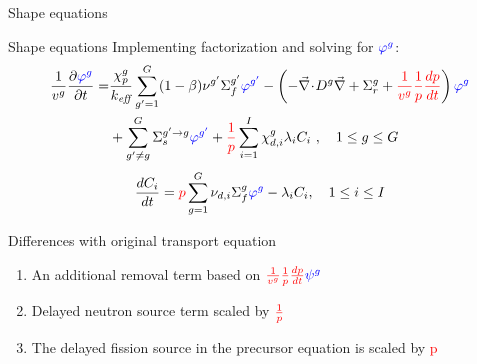 \documentclass[8pt]{beamer}
\renewcommand{\div}{\vec{\nabla}\! \cdot \!}
\newcommand{\grad}{\vec{\nabla}}
\newcommand{\be}{\begin{equation*}}
\newcommand{\ee}{\end{equation*}}
\newcommand{\ben}{\begin{enumerate}}
\newcommand{\een}{\end{enumerate}}
\newcommand{\keff}{\ensuremath{k_{\textit{eff}}}}
\newcommand{\tcr}[1]{\textcolor{red}{#1}}
\newcommand{\tcb}[1]{\textcolor{blue}{#1}}
\begin{document}
\begin{frame}{Shape equations}

\begin{block}{Shape equations}
Implementing factorization and solving for $\tcb{\varphi^g}$:
\begin{align*}
\frac{1}{v^g} \frac{\partial \tcb{\varphi^g} }{\partial t} =& \frac{\chi_p^g}{\keff} \sum_{g'=1}^G (1-\beta) \nu^{g'} \Sigma_f^{g'} \tcb{\varphi^{g'}} -  \left( -\div D^g \grad  + \Sigma_r^g + \tcr{\frac{1}{v^g}}\tcr{\frac{1}{p}}\tcr{\frac{dp}{dt}}\right) \tcb{\varphi^g}  \nonumber \\
&  + \sum_{g'\neq g}^G\Sigma_s^{g'\to g} \tcb{\varphi^{g'}}  + \tcr{\frac{1}{p}}\sum_{i=1}^I\chi_{d,i}^g\lambda_i C_i \ , \quad 1 \le g \le G 
\end{align*}
\begin{equation*}
\frac{dC_i}{dt} = \tcr{p}\sum_{g=1}^G \nu_{d,i} \Sigma_f^g \tcb{\varphi^{g}} - \lambda_iC_i , \quad 1 \le i \le I
\end{equation*}
\end{block}

\begin{block}{Differences with original transport equation}
\ben
\item An additional removal term based on $\tcr{\frac{1}{v^g}\frac{1}{p}\frac{dp}{dt}} \tcb{\psi^g}$
\item Delayed neutron source term scaled by $\tcr{\frac{1}{p}}$
\item The delayed fission source in the precursor equation is scaled by \tcr{p}
\een
\end{block}

\end{frame}

\end{document}
